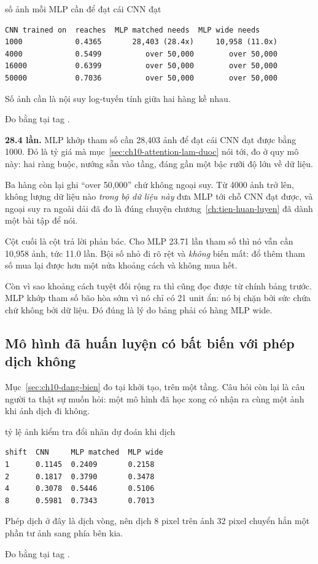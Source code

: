 \begin{measured}{số ảnh mỗi MLP cần để đạt cái CNN đạt}
\begin{verbatim}
CNN trained on  reaches  MLP matched needs  MLP wide needs
1000            0.4365       28,403 (28.4x)     10,958 (11.0x)
4000            0.5499          over 50,000        over 50,000
16000           0.6399          over 50,000        over 50,000
50000           0.7036          over 50,000        over 50,000
\end{verbatim}

Số ảnh cần là nội suy log-tuyến tính giữa hai hàng kề nhau.

Đo bằng  tại tag .
\end{measured}

\textbf{28.4 lần.} MLP khớp tham số cần 28,403 ảnh để đạt cái CNN đạt được
bằng 1000. Đó là tỷ giá mà mục~\ref{sec:ch10-attention-lam-duoc} nói tới, đo ở
quy mô này: hai ràng buộc, nướng sẵn vào tầng, đáng gần một bậc rưỡi độ lớn về
dữ liệu.

Ba hàng còn lại ghi \enquote{over 50,000} chứ không ngoại suy. Từ 4000 ảnh trở
lên, không lượng dữ liệu nào \emph{trong bộ dữ liệu này} đưa MLP tới chỗ CNN
đạt được, và ngoại suy ra ngoài dải đã đo là đúng chuyện
chương~\ref{ch:tien-huan-luyen} đã dành một bài tập để nói.

Cột cuối là cột trả lời phản bác. Cho MLP 23.71 lần tham số thì nó vẫn cần
10,958 ảnh, tức 11.0 lần. Bội số nhỏ đi rõ rệt và \emph{không} biến mất: đổ
thêm tham số mua lại được hơn một nửa khoảng cách và không mua hết.

Còn vì sao khoảng cách tuyệt đối rộng ra thì cũng đọc được từ chính bảng trước.
MLP khớp tham số bão hòa sớm vì nó chỉ có 21 unit ẩn: nó bị chặn bởi sức chứa
chứ không bởi dữ liệu. Đó đúng là lý do bảng phải có hàng MLP wide.

\subsection*{Mô hình đã huấn luyện có bất biến với phép dịch không}

%
Mục~\ref{sec:ch10-dang-bien} đo  tại khởi tạo, trên
một tầng. Câu hỏi
còn lại là câu người ta thật sự muốn hỏi: một mô hình đã học xong có nhận ra
cùng một ảnh khi ảnh dịch đi không.

\begin{measured}{tỷ lệ ảnh kiểm tra đổi nhãn dự đoán khi dịch}
\begin{verbatim}
shift  CNN     MLP matched  MLP wide
1      0.1145  0.2409       0.2158
2      0.1817  0.3790       0.3478
4      0.3078  0.5446       0.5106
8      0.5981  0.7343       0.7013
\end{verbatim}

Phép dịch ở đây là dịch vòng, nên dịch 8 pixel trên ảnh 32 pixel chuyển hẳn
một phần tư ảnh sang phía bên kia.

Đo bằng  tại tag .
\end{measured}

